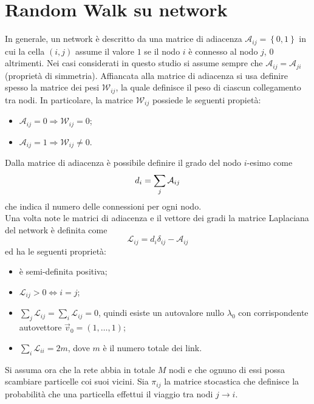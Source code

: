\documentclass[../main.tex]{subfiles}
\begin{document}
\section{Random Walk su network}
In generale, un network \`e descritto da una matrice di adiacenza $\mathcal{A}_{ij}=\left\{0,1\right\}$ in cui la cella $(i,j)$ assume il valore $1$ se il nodo $i$ \`e connesso al nodo $j$, $0$ altrimenti.
Nei casi considerati in questo studio si assume sempre che $\mathcal{A}_{ij}=\mathcal{A}_{ji}$ (proprietà di simmetria).
Affiancata alla matrice di adiacenza si usa definire spesso la matrice dei pesi $\mathcal{W}_{ij}$, la quale definisce il peso di ciascun collegamento tra nodi.
In particolare, la matrice $\mathcal{W}_{ij}$ possiede le seguenti propiet\`a:
\begin{itemize}
    \item $\mathcal{A}_{ij} = 0 \Longrightarrow \mathcal{W}_{ij} = 0$;
    \item $\mathcal{A}_{ij} = 1 \Longrightarrow \mathcal{W}_{ij} \neq 0$.
\end{itemize}
Dalla matrice di adiacenza \`e possibile definire il grado del nodo $i$-esimo come
\begin{equation*}
    d_i=\sum_j\mathcal{A}_{ij}\\
\end{equation*}
che indica il numero delle connessioni per ogni nodo.
\\Una volta note le matrici di adiacenza e il vettore dei gradi la matrice Laplaciana del network \`e definita come
\begin{equation}
    \mathcal{L}_{ij}=d_i\delta_{ij}-\mathcal{A}_{ij}
\end{equation}
ed ha le seguenti propriet\`a:
\begin{itemize}
    \item \`e semi-definita positiva;
    \item $\mathcal{L}_{ij}>0\Longleftrightarrow i=j$;
    \item $\sum_j\mathcal{L}_{ij}=\sum_i\mathcal{L}_{ij}=0$, quindi esiste un autovalore nullo $\lambda_0$ con corrispondente autovettore $\vec{v}_0=(1,\ldots,1)$;
    \item $\sum_i\mathcal{L}_{ii}=2m$, dove $m$ \`e il numero totale dei link.
\end{itemize}
Si assuma ora che la rete abbia in totale $M$ nodi e che ognuno di essi possa scambiare particelle coi suoi vicini.
Sia $\pi_{ij}$ la matrice stocastica che definisce la probabilità che una particella effettui il viaggio tra nodi $j\to i$.
\end{document}
